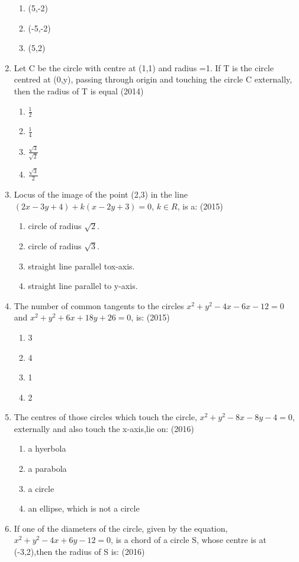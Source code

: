 \documentclass[12pt]{article}
\begin{document}
\begin{enumerate}
\begin{enumerate}
\item (5,-2)
\item (-5,-2)
\item (5,2)
\end{enumerate}
\item Let C be the circle with centre at (1,1) and radius =1. If T is the circle centred at (0,y), passing through origin and touching the circle C externally, then the radius of T is equal (2014)
\begin{enumerate}
\item $\frac{1}{2}$
\item $\frac{1}{4}$
\item $\frac{\sqrt{3}}{\sqrt{2}}$
\item $\frac{\sqrt{3}}{2}$
\end{enumerate}
\item Locus of the image of the point (2,3) in the line $(2x-3y +4)+k(x-2y+3)=0$, $k\in R$, is a: (2015)
\begin{enumerate}
\item circle of radius $\sqrt{2}$.
\item circle of radius $\sqrt{3}$.
\item straight line parallel tox-axis.
\item straight line parallel to y-axis.
\end{enumerate}
\item The number of common tangents to the circles $x^2+y^2-4x-6x-12=0$ and $x^2+y^2+6x +18y+26=0$, is:  (2015)
\begin{enumerate}
\item 3
\item 4
\item 1
\item 2
\end{enumerate}
\item The centres of those circles which touch the circle, $x^2+y^2-8x-8y-4=0$, externally and also touch the x-axis,lie on: (2016)
\begin{enumerate}
\item a hyerbola
\item a parabola
\item a circle
\item an ellipse, which is not a circle 
\end{enumerate}
\item If one of the diameters of the circle, given by the equation, $x^2+y^2-4x+6y-12=0$, is a chord of a circle S, whose centre is at (-3,2),then the radius of S is:  (2016)

\end{enumerate}
\end{document}
